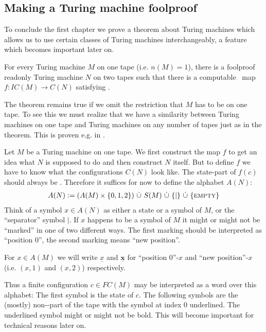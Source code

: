 \subsection{Making a Turing machine foolproof}
\label{turing_machines:main_theorem}

To conclude the first chapter we prove a theorem about Turing machines which allows us to use certain classes of Turing machines interchangeably, a feature which becomes important later on.
\begin{Theorem}
	\label{turing_machines:main_theorem:theorem}
	For every Turing machine $M$ on one tape (i.e. $n(M) = 1$), there is a foolproof readonly Turing machine $N$ on two tapes such that
	there is a computable\footnotemark~
	map $f: IC(M) \to C(N)$
	satisfying .\footnotemark
\end{Theorem}
\begin{Remark}
	The theorem remains true if we omit the restriction that $M$ has to be on one tape. To see this we must realize that we have a similarity between Turing machines on one tape and Turing machines on any number of tapes just as in the theorem. This is proven e.g. in \cite{sip06}.
\end{Remark}
\proof
	Let $M$ be a Turing machine on one tape.
	We first construct the map $f$ to get an idea what $N$ is supposed to do and then construct $N$ itself.
	But to define $f$ we have to know what the configurations $C(N)$ look like.
	The state-part of $f(c)$ should always be \INI. Therefore it suffices for now to define the alphabet $A(N)$:
	\begin{align*}
		A(N) := (A(M) \times \{0,1,2\})~\dot\cup~S(M)~\dot\cup~\{|\}~\dot\cup~\{\text{\scshape{empty}}\}
	\end{align*}
	Think of a symbol $x \in A(N)$ as either a state or a symbol of $M$, or the ``separator'' symbol $|$.
	If $x$ happens to be a symbol of $M$ it might or might not be ``marked'' in one of two different ways.
	The first marking should be interpreted as ``position $0$'', the second marking means ``new position''.

	For $x \in A(M)$ we will write
	$\underline{x}$ and $\underline{\boldsymbol{x}}$ for ``position $0$''-$x$ and ``new position''-$x$ (i.e. $(x,1)$ and $(x,2)$) respectively.

	Thus a finite configuration $c \in FC(M)$ may be interpreted as a word over this alphabet:
	The first symbol is the state of $c$. The following symbols are the (mostly) non-\EMP-part of the tape with the symbol at index $0$ underlined.
	The underlined symbol might or might not be bold. This will become important for technical reasons later on.


